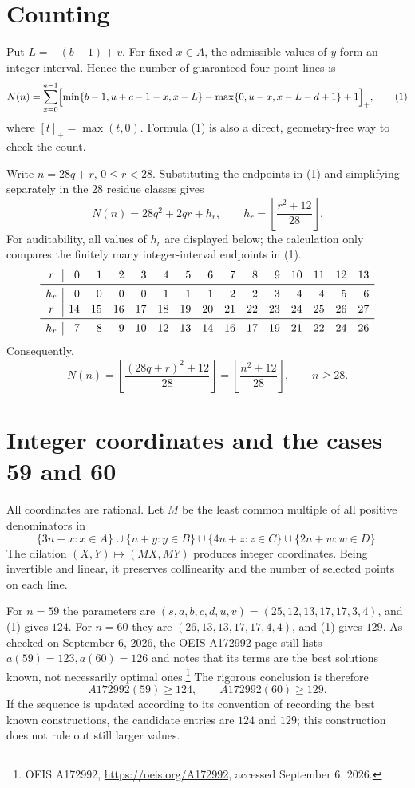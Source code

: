 \documentclass[11pt,a4paper]{article}
\newcommand{\floor}[1]{\left\lfloor #1\right\rfloor}
\begin{document}
\section*{Counting}
Put $L=-(b-1)+v$.  For fixed $x\in A$, the admissible values of $y$ form an
integer interval.  Hence the number of guaranteed four-point lines is
\[
 N(n)=\sum_{x=0}^{a-1}
 \Bigl[\min\{b-1,u+c-1-x,x-L\}
 -\max\{0,u-x,x-L-d+1\}+1\Bigr]_+,
 \tag{1}
\]
where $[t]_+=\max(t,0)$.  Formula (1) is also a direct, geometry-free way to
check the count.

Write $n=28q+r$, $0\le r<28$.  Substituting the endpoints in (1) and
simplifying separately in the 28 residue classes gives
\[
 N(n)=28q^2+2qr+h_r,\qquad h_r=\floor{\frac{r^2+12}{28}}.
\]
For auditability, all values of $h_r$ are displayed below; the calculation
only compares the finitely many integer-interval endpoints in (1).
\begingroup\scriptsize
\[
\begin{array}{c|rrrrrrrrrrrrrr}
r&0&1&2&3&4&5&6&7&8&9&10&11&12&13\\ \midrule
h_r&0&0&0&0&1&1&1&2&2&3&4&4&5&6\\[2pt]
r&14&15&16&17&18&19&20&21&22&23&24&25&26&27\\ \midrule
h_r&7&8&9&10&12&13&14&16&17&19&21&22&24&26
\end{array}
\]
\endgroup
Consequently,
\[
 N(n)=\floor{\frac{(28q+r)^2+12}{28}}
      =\floor{\frac{n^2+12}{28}},\qquad n\ge28.
\]

\section*{Integer coordinates and the cases 59 and 60}
All coordinates are rational.  Let $M$ be the least common multiple of all
positive denominators in
\[
 \{3n+x:x\in A\}\cup\{n+y:y\in B\}\cup
 \{4n+z:z\in C\}\cup\{2n+w:w\in D\}.
\]
The dilation $(X,Y)\mapsto(MX,MY)$ produces integer coordinates.  Being
invertible and linear, it preserves collinearity and the number of selected
points on each line.

For $n=59$ the parameters are
$(s,a,b,c,d,u,v)=(25,12,13,17,17,3,4)$, and (1) gives $124$.
For $n=60$ they are $(26,13,13,17,17,4,4)$, and (1) gives $129$.
As checked on September 6, 2026, the OEIS A172992 page still lists
$a(59)=123,a(60)=126$ and notes that its terms are the best solutions known,
not necessarily optimal ones.\footnote{OEIS A172992,
\url{https://oeis.org/A172992}, accessed September 6, 2026.}
The rigorous conclusion is therefore
\[
 A172992(59)\ge124,\qquad A172992(60)\ge129.
\]
If the sequence is updated according to its convention of recording the
best known constructions, the candidate entries are $124$ and $129$; this
construction does not rule out still larger values.
\end{document}
